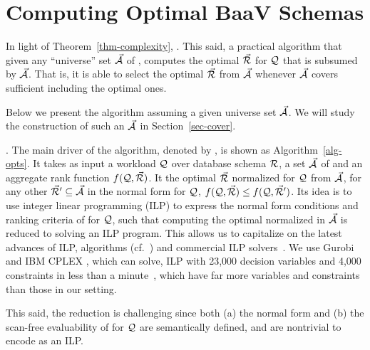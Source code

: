 \vspace{-0.7ex}
\section{Computing Optimal \textsf{BaaV} Schemas}
\label{sec-select}
\vspace{-0.4ex}

In light of Theorem~\ref{thm-complexity}, . 
This said,  a practical algorithm 
that given any ``universe'' set $\vec{{\mathcal A}}$ of \bss,
computes the optimal \bds $\vec{{\mathcal R}}$ for $\mathcal Q$ that is subsumed by
$\vec{{\mathcal A}}$. That is, it is able to select the optimal $\vec{{\mathcal R}}$
from  $\vec{{\mathcal A}}$ whenever $\vec{{\mathcal A}}$ covers sufficient \bss
including the optimal ones.


Below we present the algorithm assuming a given universe set $\vec{{\mathcal A}}$.
We will study the construction of such an $\vec{{\mathcal A}}$ in
Section~\ref{sec-cover}.





.
The main driver of the algorithm, denoted by \opts,
is shown as
Algorithm~\ref{alg-opts}. It takes as input a workload $\mathcal Q$ over
database schema ${\mathcal R}$, a set $\vec{{\mathcal A}}$ of \bss and an aggregate rank
function $f(\mathcal Q,\allowbreak \vec{{\mathcal R}})$.
It  %
the optimal \bds $\vec{{\mathcal R}}$ normalized for $\mathcal Q$ from $\vec{{\mathcal A}}$,
\ie for any other \bds $\vec{{\mathcal R}}'\allowbreak \subseteq \allowbreak \vec{{\mathcal A}}$ in the
normal form for $\mathcal Q$, $f(\mathcal Q,\allowbreak \vec{{\mathcal R}})\allowbreak \leq\allowbreak f(\mathcal Q,\allowbreak \vec{{\mathcal R}}')$.
%
Its  %
idea is to use integer linear programming (ILP) to
express the normal form conditions and ranking criteria of \bdss
for $\mathcal Q$, such that computing the optimal normalized \bds in $\vec{{\mathcal A}}$
is reduced to solving an ILP program. This allows us to 
capitalize on the latest advances of ILP, \eg algorithms
(cf.~\cite{ILPbook}) and commercial ILP
solvers~\cite{cplex,gurobi,XpressMP}. We use
Gurobi~\cite{gurobi} and IBM CPLEX \cite{cplex}, which can solve,
\eg ILP with 23,000 decision variables and 4,000  constraints
in less than a minute~\cite{ILPstat}, which have far more
variables and constraints than those in our setting.



This said, the reduction
is challenging since both (a) the normal form and (b) the
scan-free evaluability of \bdss for $\mathcal Q$ are semantically defined, 
and are nontrivial to encode as  an ILP.

